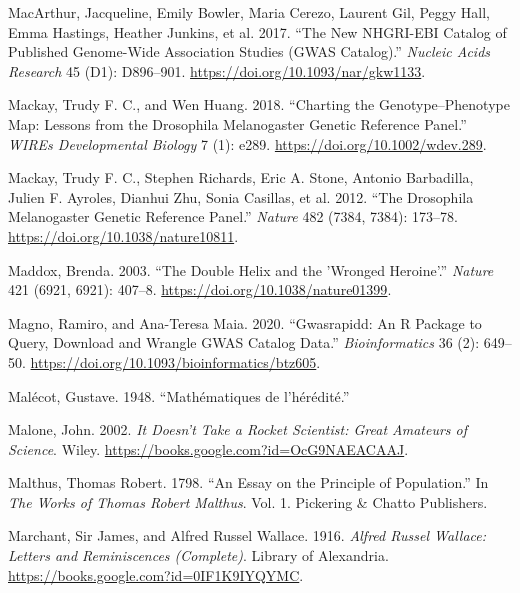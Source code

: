 \documentclass[
]{book}
\newlength{\cslhangindent}
\newlength{\cslentryspacingunit} %
\newenvironment{CSLReferences}[2] %
 {%
  \setlength{\parindent}{0pt}
  \ifodd #1
  \let\oldpar\par
  \def\par{\hangindent=\cslhangindent\oldpar}
  \fi
  \setlength{\parskip}{#2\cslentryspacingunit}
 }%
 {}
\begin{document}
\begin{CSLReferences}{1}{0}
\leavevmode{}%
MacArthur, Jacqueline, Emily Bowler, Maria Cerezo, Laurent Gil, Peggy Hall, Emma Hastings, Heather Junkins, et al. 2017. {``The New {NHGRI-EBI Catalog} of Published Genome-Wide Association Studies ({GWAS Catalog}).''} \emph{Nucleic Acids Research} 45 (D1): D896--901. \url{https://doi.org/10.1093/nar/gkw1133}.

\leavevmode{}%
Mackay, Trudy F. C., and Wen Huang. 2018. {``Charting the Genotype--Phenotype Map: Lessons from the {Drosophila} Melanogaster {Genetic Reference Panel}.''} \emph{WIREs Developmental Biology} 7 (1): e289. \url{https://doi.org/10.1002/wdev.289}.

\leavevmode{}%
Mackay, Trudy F. C., Stephen Richards, Eric A. Stone, Antonio Barbadilla, Julien F. Ayroles, Dianhui Zhu, Sonia Casillas, et al. 2012. {``The {Drosophila} Melanogaster {Genetic Reference Panel}.''} \emph{Nature} 482 (7384, 7384): 173--78. \url{https://doi.org/10.1038/nature10811}.

\leavevmode{}%
Maddox, Brenda. 2003. {``The Double Helix and the 'Wronged Heroine'.''} \emph{Nature} 421 (6921, 6921): 407--8. \url{https://doi.org/10.1038/nature01399}.

\leavevmode{}%
Magno, Ramiro, and Ana-Teresa Maia. 2020. {``Gwasrapidd: An {R} Package to Query, Download and Wrangle {GWAS} Catalog Data.''} \emph{Bioinformatics} 36 (2): 649--50. \url{https://doi.org/10.1093/bioinformatics/btz605}.

\leavevmode{}%
Malécot, Gustave. 1948. {``Mathématiques de l'hérédité.''}

\leavevmode{}%
Malone, John. 2002. \emph{It {Doesn}'t {Take} a {Rocket Scientist}: {Great Amateurs} of {Science}}. {Wiley}. \url{https://books.google.com?id=OcG9NAEACAAJ}.

\leavevmode{}%
Malthus, Thomas Robert. 1798. {``An Essay on the Principle of Population.''} In \emph{The Works of {Thomas Robert Malthus}}. Vol. 1. {Pickering \& Chatto Publishers}.

\leavevmode{}%
Marchant, Sir James, and Alfred Russel Wallace. 1916. \emph{Alfred {Russel Wallace}: {Letters} and {Reminiscences} ({Complete})}. {Library of Alexandria}. \url{https://books.google.com?id=0IF1K9IYQYMC}.


\end{CSLReferences}
\end{document}
